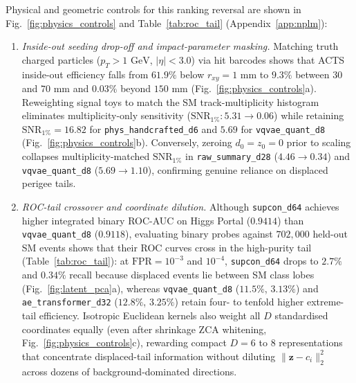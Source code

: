 \documentclass{article}
\begin{document}
Physical and geometric controls for this ranking reversal are shown in Fig.~\ref{fig:physics_controls} and Table~\ref{tab:roc_tail} (Appendix~\ref{app:nplm}):
\begin{enumerate}
    \item \emph{Inside-out seeding drop-off and impact-parameter masking.} Matching truth charged particles ($p_T > 1\text{ GeV}$, $|\eta| < 3.0$) via hit barcodes shows that \textsc{ACTS} inside-out efficiency falls from $61.9\%$ below $r_{xy} = 1\text{ mm}$ to $9.3\%$ between $30$ and $70\text{ mm}$ and $0.03\%$ beyond $150\text{ mm}$ (Fig.~\ref{fig:physics_controls}a). Reweighting signal toys to match the SM track-multiplicity histogram eliminates multiplicity-only sensitivity ($\text{SNR}_{1\%}: 5.31 \to 0.06$) while retaining $\text{SNR}_{1\%} = 16.82$ for \texttt{phys\_handcrafted\_d6} and $5.69$ for \texttt{vqvae\_quant\_d8} (Fig.~\ref{fig:physics_controls}b). Conversely, zeroing $d_0 = z_0 = 0$ prior to scaling collapses multiplicity-matched $\text{SNR}_{1\%}$ in \texttt{raw\_summary\_d28} ($4.46 \to 0.34$) and \texttt{vqvae\_quant\_d8} ($5.69 \to 1.10$), confirming genuine reliance on displaced perigee tails.
    \item \emph{ROC-tail crossover and coordinate dilution.} Although \texttt{supcon\_d64} achieves higher integrated binary ROC-AUC on Higgs Portal ($0.9414$) than \texttt{vqvae\_quant\_d8} ($0.9118$), evaluating binary probes against $702,000$ held-out SM events shows that their ROC curves cross in the high-purity tail (Table~\ref{tab:roc_tail}): at $\text{FPR} = 10^{-3}$ and $10^{-4}$, \texttt{supcon\_d64} drops to $2.7\%$ and $0.34\%$ recall because displaced events lie between SM class lobes (Fig.~\ref{fig:latent_pca}a), whereas \texttt{vqvae\_quant\_d8} ($11.5\%$, $3.13\%$) and \texttt{ae\_transformer\_d32} ($12.8\%$, $3.25\%$) retain four- to tenfold higher extreme-tail efficiency. Isotropic Euclidean kernels also weight all $D$ standardised coordinates equally (even after shrinkage ZCA whitening, Fig.~\ref{fig:physics_controls}c), rewarding compact $D=6$ to $8$ representations that concentrate displaced-tail information without diluting $\|\mathbf{z} - c_i\|_2^2$ across dozens of background-dominated directions.
\end{enumerate}
\end{document}
